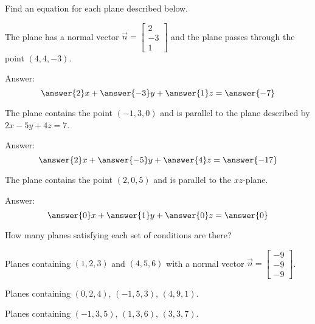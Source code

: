 \documentclass{ximera}
\begin{document}
\begin{problem}
Find an equation for each plane described below.

  \begin{problem}\label{prob:eqplane1}
  The plane has a normal vector $\vec{n}=\begin{bmatrix}2\\-3\\1\end{bmatrix}$ and the plane passes through the point $(4, 4, -3)$.
  
  Answer: $$\answer{2}x+\answer{-3}y+\answer{1}z=\answer{-7}$$
  \end{problem}
  
  \begin{problem}\label{prob:eqplane2}
  The plane contains the point $(-1, 3, 0)$ and is parallel to the plane described by $2x-5y+4z=7$.
  
  Answer:
  $$\answer{2}x+\answer{-5}y+\answer{4}z=\answer{-17}$$
  \end{problem}
  
  \begin{problem}\label{prob:eqplane3}
  The plane contains the point $(2, 0, 5)$ and is parallel to the $xz$-plane.
  
  Answer:
  $$\answer{0}x+\answer{1}y+\answer{0}z=\answer{0}$$
  \end{problem}

\end{problem}

\begin{problem}
How many planes satisfying each set of conditions are there?

\begin{problem}\label{prob:eqplane4}
Planes containing $(1, 2, 3)$ and $(4, 5, 6)$ with a normal vector $\vec{n}=\begin{bmatrix}-9\\-9\\-9\end{bmatrix}$.
\begin{multipleChoice}
 \end{multipleChoice}
\end{problem}

\begin{problem}\label{prob:eqplane5}
Planes containing $(0,2, 4)$, $(-1, 5, 3)$, $(4, 9, 1)$.
\begin{multipleChoice}
 \end{multipleChoice}
\end{problem}

\begin{problem}\label{prob:eqplane6}
Planes containing $(-1, 3, 5)$, $(1, 3, 6)$, $(3, 3, 7)$.
\begin{multipleChoice}
 \end{multipleChoice}
\end{problem}

\end{problem}
\end{document}
